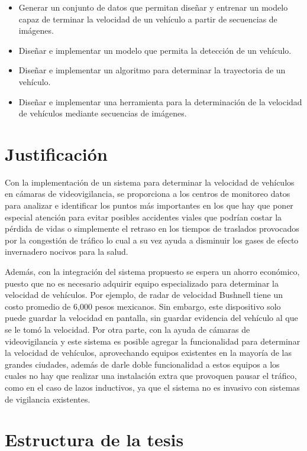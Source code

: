 \begin{itemize}
    \item Generar un conjunto de datos que permitan diseñar y entrenar un modelo capaz de terminar la velocidad de un vehículo a partir de secuencias de imágenes.
    \item Diseñar e implementar un modelo que permita la detección de un vehículo. 
    \item Diseñar e implementar un algoritmo para determinar la trayectoria de un vehículo.
    \item Diseñar e implementar una herramienta para la determinación de la velocidad de vehículos mediante secuencias de imágenes.
\end{itemize}

\section{Justificación}

Con la implementación de un sistema para determinar la velocidad de vehículos en cámaras de videovigilancia, se proporciona a los centros de monitoreo datos para analizar e identificar los puntos más importantes en los que hay que poner especial atención para evitar posibles accidentes viales que podrían costar la pérdida de vidas o simplemente el retraso en los tiempos de traslados provocados por la congestión de tráfico lo cual a su vez ayuda a disminuir los gases de efecto invernadero nocivos para la salud.

Además, con la integración del sistema propuesto se espera un ahorro económico, puesto que no es necesario adquirir equipo especializado para determinar la velocidad de vehículos. Por ejemplo, de radar de velocidad Bushnell tiene un costo promedio de 6,000 pesos mexicanos. Sin embargo, este dispositivo solo puede guardar la velocidad en pantalla, sin guardar evidencia del vehículo al que se le tomó la velocidad. Por otra parte, con la ayuda de cámaras de videovigilancia y este sistema es posible agregar la funcionalidad para determinar la velocidad de vehículos, aprovechando equipos existentes en la mayoría de las grandes ciudades, además de darle doble funcionalidad a estos equipos a los cuales no hay que realizar una instalación extra que provoquen pausar el tráfico, como en el caso de lazos inductivos, ya que el sistema no es invasivo con sistemas de vigilancia existentes.


\section{Estructura de la tesis}

